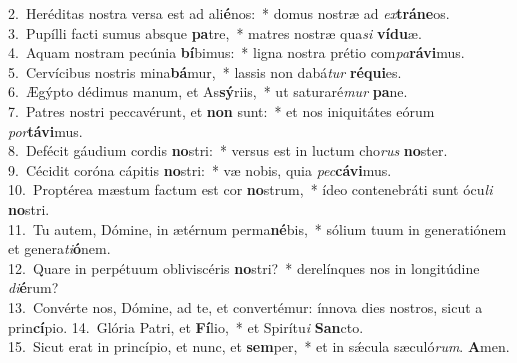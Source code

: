 {2.~}Heréditas nostra versa est ad ali\textbf{é}nos:~* domus nostræ ad \textit{ex}\textbf{trá}\textbf{ne}os.\\
{3.~}Pupílli facti sumus absque \textbf{pa}tre,~* matres nostræ qua\textit{si} \textbf{ví}\textbf{du}æ.\\
{4.~}Aquam nostram pecúnia \textbf{bí}bimus:~* ligna nostra prétio com\textit{pa}\textbf{rá}\textbf{vi}mus.\\
{5.~}Cervícibus nostris mina\textbf{bá}mur,~* lassis non dabá\textit{tur} \textbf{ré}\textbf{qui}es.\\
{6.~}Ægýpto dédimus manum, et As\textbf{sý}riis,~* ut saturaré\textit{mur} \textbf{pa}ne.\\
{7.~}Patres nostri peccavérunt, et \textbf{non} sunt:~* et nos iniquitátes eórum \textit{por}\textbf{tá}\textbf{vi}mus.\\
{8.~}Defécit gáudium cordis \textbf{no}stri:~* versus est in luctum cho\textit{rus} \textbf{no}ster.\\
{9.~}Cécidit coróna cápitis \textbf{no}stri:~* væ nobis, quia \textit{pec}\textbf{cá}\textbf{vi}mus.\\
{10.~}Proptérea mæstum factum est cor \textbf{no}strum,~* ídeo contenebráti sunt ócu\textit{li} \textbf{no}stri.\\
{11.~}Tu autem, Dómine, in ætérnum perma\textbf{né}bis,~* sólium tuum in generatiónem et genera\textit{ti}\textbf{ó}nem.\\
{12.~}Quare in perpétuum obliviscéris \textbf{no}stri?~* derelínques nos in longitúdine \textit{di}\textbf{é}rum?\\
{13.~}Convérte nos, Dómine, ad te, et convertémur: ínnova dies nostros, sicut a prin\textbf{cí}pio.
{14.~}Glória Patri, et \textbf{Fí}lio,~* et Spirítu\textit{i} \textbf{San}cto.\\
{15.~}Sicut erat in princípio, et nunc, et \textbf{sem}per,~* et in sǽcula sæculó\textit{rum}. \textbf{A}men.\\
